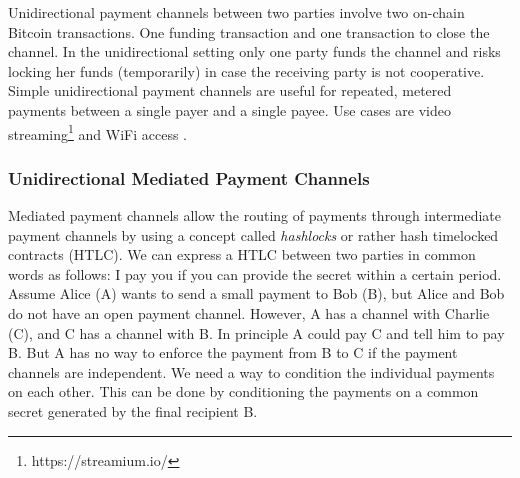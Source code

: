 Unidirectional payment channels between two parties involve two on-chain Bitcoin transactions. One funding transaction and one transaction to close the channel. In the unidirectional setting only one party funds the channel and risks locking her funds (temporarily) in case the receiving party is not cooperative. Simple unidirectional payment channels are useful for repeated, metered payments between a single payer and a single payee. Use cases are video streaming\footnote{https://streamium.io/} and WiFi access \cite{Siby2013}.

\subsubsection{Unidirectional Mediated Payment Channels}

Mediated payment channels allow the routing of payments through intermediate payment channels by using a concept called \emph{hashlocks} or rather hash timelocked contracts (HTLC). We can express a HTLC between two parties in common words as follows: I pay you if you can provide the secret within a certain period. Assume Alice (A) wants to send a small payment to Bob (B), but Alice and Bob do not have an open payment channel. However, A has a channel with Charlie (C), and C has a channel with B. In principle A could pay C and tell him to pay B. But A has no way to enforce the payment from B to C if the payment channels are independent. We need a way to condition the individual payments on each other. This can be done by conditioning the payments on a common secret generated by the final recipient B. 


